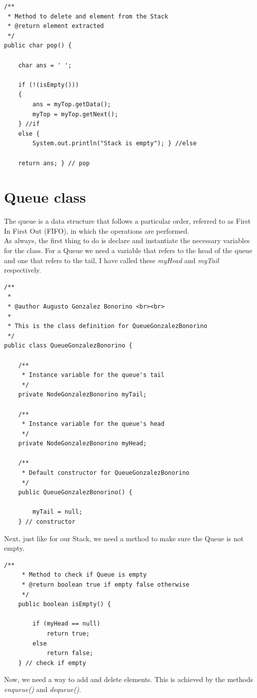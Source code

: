 \documentclass[letterpaper, 10pt]{article}
\begin{document}
\begin{lstlisting}
/**
 * Method to delete and element from the Stack
 * @return element extracted
 */
public char pop() {
	
	char ans = ' ';
	
	if (!(isEmpty())) 
	{	
		ans = myTop.getData();
		myTop = myTop.getNext();
	} //if
	else {
		System.out.println("Stack is empty"); } //else
	
	return ans; } // pop
\end{lstlisting}

\section{Queue class}
The queue is a data structure that follows a particular order, referred to as First In First Out (FIFO), in which  the operations are performed.
\\
As always, the first thing to do is declare and instantiate the necessary variables for the class. For a Queue we need a variable that refers to the head of the queue and one that refers to the tail, I have called these \textit{myHead} and \textit{myTail} respectively.
\begin{lstlisting}
/**
 * 
 * @author Augusto Gonzalez Bonorino <br><br>
 *
 * This is the class definition for QueueGonzalezBonorino
 */
public class QueueGonzalezBonorino {
	
	/**
	 * Instance variable for the queue's tail
	 */
	private NodeGonzalezBonorino myTail;

	/**
	 * Instance variable for the queue's head
	 */
	private NodeGonzalezBonorino myHead;
	
	/**
	 * Default constructor for QueueGonzalezBonorino
	 */
	public QueueGonzalezBonorino() {
		
		myTail = null;
	} // constructor
\end{lstlisting}

Next, just like for our Stack, we need a method to make sure the Queue is not empty.

\begin{lstlisting}
/**
	 * Method to check if Queue is empty
	 * @return boolean true if empty false otherwise
	 */
	public boolean isEmpty() {
		
		if (myHead == null)
			return true;
		else
			return false;
	} // check if empty
\end{lstlisting}

Now, we need a way to add and delete elements. This is achieved by the methods \textit{enqueue()} and \textit{dequeue()}.
\end{document}
